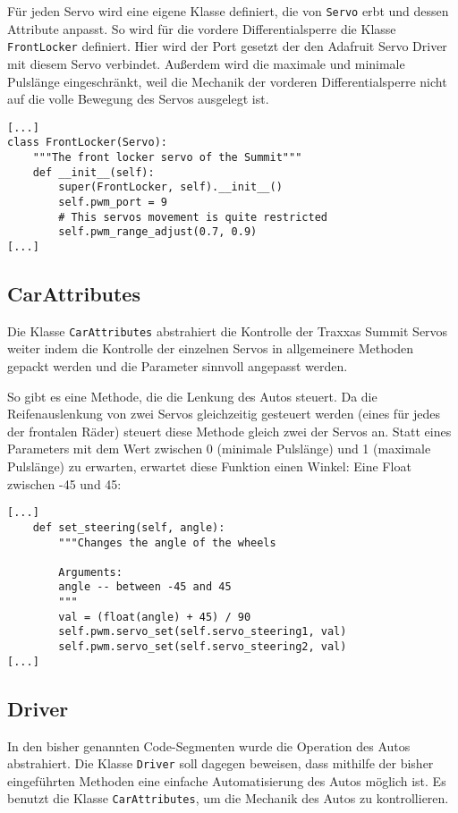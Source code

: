 \documentclass[a4paper,10pt]{scrartcl}
\begin{document}
    Für jeden Servo wird eine eigene Klasse definiert, die von \lstinline{Servo}
    erbt und dessen Attribute anpasst.
    So wird für die vordere Differentialsperre die Klasse \lstinline{FrontLocker}
    definiert.
    Hier wird der Port gesetzt der den Adafruit Servo Driver mit diesem Servo
    verbindet.
    Außerdem wird die maximale und minimale Pulslänge eingeschränkt, weil die
    Mechanik der vorderen Differentialsperre nicht auf die volle Bewegung des
    Servos ausgelegt ist.
    \begin{lstlisting}
[...]
class FrontLocker(Servo):
    """The front locker servo of the Summit"""
    def __init__(self):
        super(FrontLocker, self).__init__()
        self.pwm_port = 9
        # This servos movement is quite restricted
        self.pwm_range_adjust(0.7, 0.9)
[...]
    \end{lstlisting}

  \subsection{CarAttributes}

    Die Klasse \lstinline{CarAttributes} abstrahiert die Kontrolle der Traxxas
    Summit Servos weiter indem die Kontrolle der einzelnen Servos in
    allgemeinere Methoden gepackt werden und die Parameter sinnvoll angepasst
    werden.

    So gibt es eine Methode, die die Lenkung des Autos steuert.
    Da die Reifenauslenkung von zwei Servos gleichzeitig gesteuert werden
    (eines für jedes der frontalen Räder) steuert diese Methode gleich zwei der
    Servos an.
    Statt eines Parameters mit dem Wert zwischen 0 (minimale Pulslänge) und 1
    (maximale Pulslänge) zu erwarten, erwartet diese Funktion einen Winkel:
    Eine Float zwischen -45 und 45:
    \begin{lstlisting}
[...]
    def set_steering(self, angle):
        """Changes the angle of the wheels

        Arguments:
        angle -- between -45 and 45
        """
        val = (float(angle) + 45) / 90
        self.pwm.servo_set(self.servo_steering1, val)
        self.pwm.servo_set(self.servo_steering2, val)
[...]
    \end{lstlisting}

  \subsection{Driver}

    In den bisher genannten Code-Segmenten wurde die Operation des Autos
    abstrahiert.
    Die Klasse \lstinline{Driver} soll dagegen beweisen, dass mithilfe der
    bisher eingeführten Methoden eine einfache Automatisierung des Autos
    möglich ist.
    Es benutzt die Klasse \lstinline{CarAttributes}, um die Mechanik des Autos
    zu kontrollieren.
\end{document}
